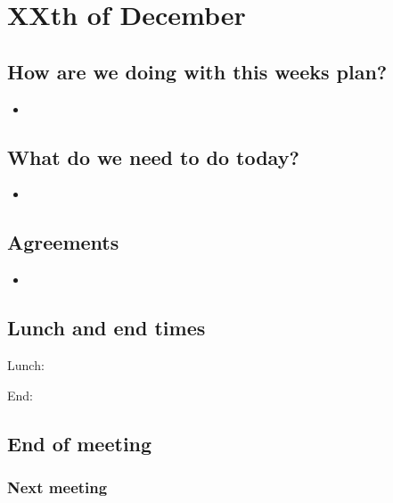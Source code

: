 \section{XXth of December}
\subsection{How are we doing with this weeks plan?}
\begin{itemize}
\item  
\end{itemize}

\subsection{What do we need to do today?}
\begin{itemize}
\item 
\end{itemize}

\subsection{Agreements}
\begin{itemize}
\item 
\end{itemize}
\subsection{Lunch and end times}
Lunch:

End:

\subsection{End of meeting}
\subsubsection{Next meeting}
